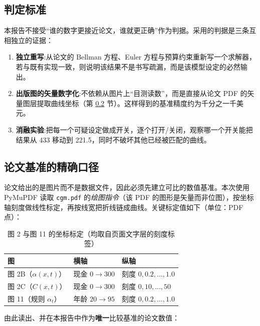 \documentclass[UTF8,a4paper,11pt,fontset=fandol]{ctexart}
\begin{document}
\subsection{判定标准}
本报告不接受“谁的数字更接近论文，谁就更正确”作为判据。采用的判据是三条互相独立的证据：
\begin{enumerate}[leftmargin=2.2em,itemsep=1pt]
\item \textbf{独立重写}:从论文的 Bellman 方程、Euler 方程与预算约束重新写一个求解器，若与既有实现一致，则说明该结果不是书写疏漏，而是该模型设定的必然输出。
\item \textbf{出版图的矢量数字化}:不依赖从图片上“目测读数”，而是直接从论文 PDF 的矢量图层提取曲线坐标（第 \ref{sec:digit} 节）。这样得到的基准精度约为千分之一千美元。
\item \textbf{消融实验}:把每一个可疑设定做成开关，逐个打开/关闭，观察哪一个开关能把结果从 433 移动到 221.5，同时不破坏其他已经被匹配的曲线。
\end{enumerate}

\subsection{论文基准的精确口径}
\label{sec:digit}
论文给出的是图片而不是数据文件，因此必须先建立可比的数值基准。本次使用 PyMuPDF 读取 \texttt{cgm.pdf} 的\emph{绘图指令}（该 PDF 的图形是矢量而非位图），按坐标轴刻度做线性标定，再按线宽把折线链成曲线。关键标定值如下（单位：PDF 点）：

\begin{table}[htbp]\centering\small
\caption{图 2 与图 11 的坐标标定（均取自页面文字层的刻度标签）}\vspace{-2pt}
\begin{tabular}{@{}lll@{}}\toprule
图 & 横轴 & 纵轴\\\midrule
图 2B（\(\alpha(x,t)\)）& 现金 \(0\!\to\!300\) & 刻度 \(0,0.2,\ldots,1.0\)\\
图 2C（\(C(x,t)\)）& 现金 \(0\!\to\!300\) & 刻度 \(0,10,\ldots,50\)\\
图 11（规则 \(\alpha_t\)）& 年龄 \(20\!\to\!95\) & 刻度 \(0,0.2,\ldots,1.0\)\\\bottomrule
\end{tabular}
\end{table}

由此读出、并在本报告中作为\textbf{唯一}比较基准的论文数值：
\end{document}
